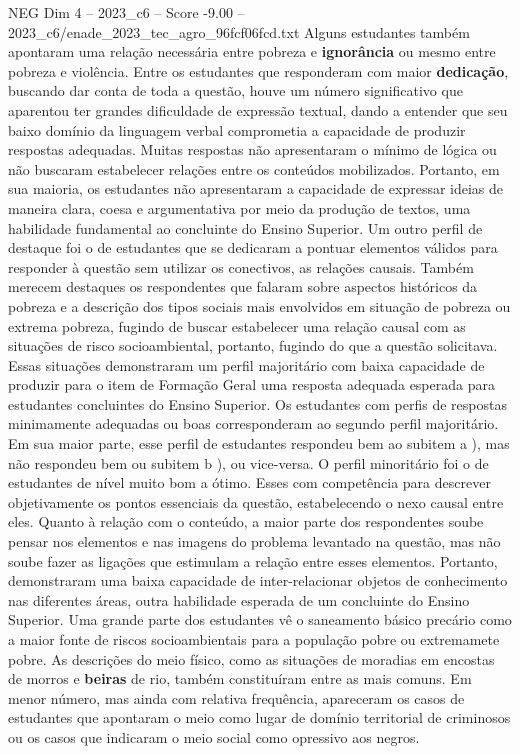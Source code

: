 \begin{textsample}{NEG Dim 4 – 2023\_c6 – Score -9.00 – 2023\_c6/enade\_2023\_tec\_agro\_96fcf06fcd.txt}
Alguns estudantes também apontaram uma relação necessária entre pobreza e \textbf{ignorância} ou mesmo entre pobreza e violência.
Entre os estudantes que responderam com maior \textbf{dedicação}, buscando dar conta de toda a questão, houve um número significativo que aparentou ter grandes dificuldade de expressão textual, dando a entender que seu baixo domínio da linguagem verbal comprometia a capacidade de produzir respostas adequadas.
Muitas respostas não apresentaram o mínimo de lógica ou não buscaram estabelecer relações entre os conteúdos mobilizados.
Portanto, em sua maioria, os estudantes não apresentaram a capacidade de expressar ideias de maneira clara, coesa e argumentativa por meio da produção de textos, uma habilidade fundamental ao concluinte do Ensino Superior.
Um outro perfil de destaque foi o de estudantes que se dedicaram a pontuar elementos válidos para responder à questão sem utilizar os conectivos, as relações causais.
Também merecem destaques os respondentes que falaram sobre aspectos históricos da pobreza e a descrição dos tipos sociais mais envolvidos em situação de pobreza ou extrema pobreza, fugindo de buscar estabelecer uma relação causal com as situações de risco socioambiental, portanto, fugindo do que a questão solicitava.
Essas situações demonstraram um perfil majoritário com baixa capacidade de produzir para o item de Formação Geral uma resposta adequada esperada para estudantes concluintes do Ensino Superior.
Os estudantes com perfis de respostas minimamente adequadas ou boas corresponderam ao segundo perfil majoritário.
Em sua maior parte, esse perfil de estudantes respondeu bem ao subitem a ), mas não respondeu bem ou subitem b ), ou vice-versa.
O perfil minoritário foi o de estudantes de nível muito bom a ótimo.
Esses com competência para descrever objetivamente os pontos essenciais da questão, estabelecendo o nexo causal entre eles.
Quanto à relação com o conteúdo, a maior parte dos respondentes soube pensar nos elementos e nas imagens do problema levantado na questão, mas não soube fazer as ligações que estimulam a relação entre esses elementos.
Portanto, demonstraram uma baixa capacidade de inter-relacionar objetos de conhecimento nas diferentes áreas, outra habilidade esperada de um concluinte do Ensino Superior.
Uma grande parte dos estudantes vê o saneamento básico precário como a maior fonte de riscos socioambientais para a população pobre ou extremamete pobre.
As descrições do meio físico, como as situações de moradias em encostas de morros e \textbf{beiras} de rio, também constituíram entre as mais comuns.
Em menor número, mas ainda com relativa frequência, apareceram os casos de estudantes que apontaram o meio como lugar de domínio territorial de criminosos ou os casos que indicaram o meio social como opressivo aos negros.

\end{textsample}
